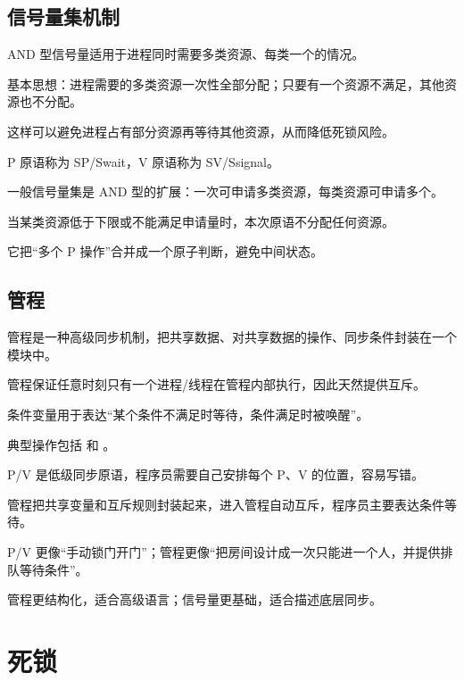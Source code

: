 \section{信号量集机制}
\begin{points}
  \item AND 型信号量适用于进程同时需要多类资源、每类一个的情况。
  \item 基本思想：进程需要的多类资源一次性全部分配；只要有一个资源不满足，其他资源也不分配。
  \item 这样可以避免进程占有部分资源再等待其他资源，从而降低死锁风险。
  \item P 原语称为 SP/Swait，V 原语称为 SV/Ssignal。
\end{points}


\begin{points}
  \item 一般信号量集是 AND 型的扩展：一次可申请多类资源，每类资源可申请多个。
  \item 当某类资源低于下限或不能满足申请量时，本次原语不分配任何资源。
  \item 它把“多个 P 操作”合并成一个原子判断，避免中间状态。
\end{points}


\section{管程}
\begin{points}
  \item 管程是一种高级同步机制，把共享数据、对共享数据的操作、同步条件封装在一个模块中。
  \item 管程保证任意时刻只有一个进程/线程在管程内部执行，因此天然提供互斥。
  \item 条件变量用于表达“某个条件不满足时等待，条件满足时被唤醒”。
  \item 典型操作包括  和 。
\end{points}


\begin{points}
  \item P/V 是低级同步原语，程序员需要自己安排每个 P、V 的位置，容易写错。
  \item 管程把共享变量和互斥规则封装起来，进入管程自动互斥，程序员主要表达条件等待。
  \item P/V 更像“手动锁门开门”；管程更像“把房间设计成一次只能进一个人，并提供排队等待条件”。
  \item 管程更结构化，适合高级语言；信号量更基础，适合描述底层同步。
\end{points}


\chapter{死锁}
